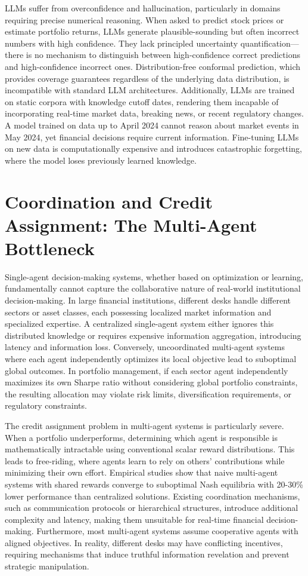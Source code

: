 \documentclass[12pt,a4paper,oneside]{report}
\theoremstyle{definition}
\theoremstyle{remark}
\begin{document}
LLMs suffer from overconfidence and hallucination, particularly in domains requiring precise numerical reasoning. When asked to predict stock prices or estimate portfolio returns, LLMs generate plausible-sounding but often incorrect numbers with high confidence. They lack principled uncertainty quantification—there is no mechanism to distinguish between high-confidence correct predictions and high-confidence incorrect ones. Distribution-free conformal prediction, which provides coverage guarantees regardless of the underlying data distribution, is incompatible with standard LLM architectures. Additionally, LLMs are trained on static corpora with knowledge cutoff dates, rendering them incapable of incorporating real-time market data, breaking news, or recent regulatory changes. A model trained on data up to April 2024 cannot reason about market events in May 2024, yet financial decisions require current information. Fine-tuning LLMs on new data is computationally expensive and introduces catastrophic forgetting, where the model loses previously learned knowledge.

\section{Coordination and Credit Assignment: The Multi-Agent Bottleneck}

Single-agent decision-making systems, whether based on optimization or learning, fundamentally cannot capture the collaborative nature of real-world institutional decision-making. In large financial institutions, different desks handle different sectors or asset classes, each possessing localized market information and specialized expertise. A centralized single-agent system either ignores this distributed knowledge or requires expensive information aggregation, introducing latency and information loss. Conversely, uncoordinated multi-agent systems where each agent independently optimizes its local objective lead to suboptimal global outcomes. In portfolio management, if each sector agent independently maximizes its own Sharpe ratio without considering global portfolio constraints, the resulting allocation may violate risk limits, diversification requirements, or regulatory constraints.

The credit assignment problem in multi-agent systems is particularly severe. When a portfolio underperforms, determining which agent is responsible is mathematically intractable using conventional scalar reward distributions. This leads to free-riding, where agents learn to rely on others' contributions while minimizing their own effort. Empirical studies show that naive multi-agent systems with shared rewards converge to suboptimal Nash equilibria with 20-30\% lower performance than centralized solutions. Existing coordination mechanisms, such as communication protocols or hierarchical structures, introduce additional complexity and latency, making them unsuitable for real-time financial decision-making. Furthermore, most multi-agent systems assume cooperative agents with aligned objectives. In reality, different desks may have conflicting incentives, requiring mechanisms that induce truthful information revelation and prevent strategic manipulation.
\end{document}
